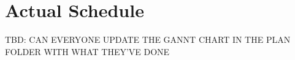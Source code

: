 \section{Actual Schedule}
TBD: CAN EVERYONE UPDATE THE GANNT CHART IN THE PLAN FOLDER WITH WHAT THEY'VE DONE
